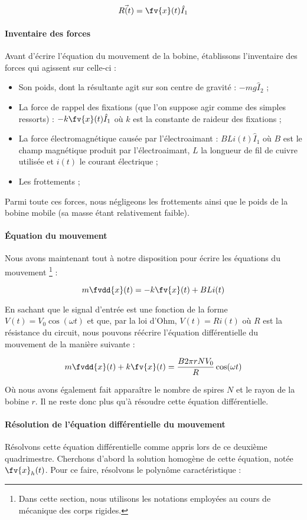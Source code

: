 {$$\vec{R(t)} = \fv{x}(t) \hat{I}_1$$

\paragraph{Inventaire des forces}
Avant d'écrire l'équation du mouvement de la bobine, établissons l'inventaire
des forces qui agissent sur celle-ci :

\begin{itemize}
\item Son poids, dont la résultante agit sur son centre de gravité : $-mg\hat{I}_2$ ;
\item La force de rappel des fixations (que l'on suppose agir comme des simples
ressorts) : $-k \fv{x}(t) \hat{I}_1$ où $k$ est la constante de raideur des fixations ;
\item La force électromagnétique causée par l'électroaimant : $BLi(t) \hat{I}_1$ où
$B$ est le champ magnétique produit par l'électroaimant, $L$ la longueur de fil de cuivre
utilisée et $i(t)$ le courant électrique ;
\item Les frottements ;
\end{itemize}
Parmi toute ces forces, nous négligeons les frottements ainsi que le poids
de la bobine mobile (sa masse étant relativement faible).
\paragraph{Équation du mouvement}
Nous avons maintenant tout à notre disposition pour écrire les équations du mouvement
\footnote{Dans cette section, nous utilisons les notations employées au cours de
mécanique des corps rigides.} :

$$m\fvdd{x}(t) = -k\fv{x}(t) + BLi(t)$$

En sachant que le signal d'entrée est une fonction de la forme $V(t) = V_0 \cos (\omega t)$ et
que, par la loi d'Ohm, $V(t) = Ri(t)$ où $R$ est la résistance du circuit,
nous pouvons réécrire l'équation différentielle du mouvement de la manière suivante :

$$m\fvdd{x}(t) + k\fv{x}(t) = \frac{B2\pi rNV_0}{R}\cos (\omega t)$$

Où nous avons également fait apparaître le nombre de spires $N$ et le rayon de la bobine
$r$. Il ne reste donc plus qu'à résoudre cette équation différentielle.

\paragraph{Résolution de l'équation différentielle du mouvement}
Résolvons cette équation différentielle comme appris lors de ce deuxième
quadrimestre. Cherchons d'abord la solution homogène de cette équation, notée $\fv{x}_h(t)$.
Pour ce faire, résolvons le polynôme caractéristique :

}
